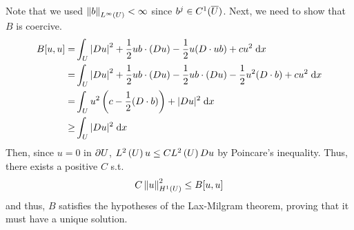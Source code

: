 Note that we used $\left\lVert b\right\rVert_{L^{\infty}(U)} < \infty$ since $b^j \in C^1({\overline {U}})$.
Next, we need to show that $B$ is coercive.
\begin{align*}
  B[u, u] = &\int_{U} \left\lvert D u \right\rvert^2
             + \frac{1}{2} u b \cdot (D u)
             - \frac{1}{2} u (D \cdot u b) + c u^2 \;\mathrm{d}x\\
          = &\int_{U} \left\lvert D u \right\rvert^2
             + \frac{1}{2} u b \cdot (D u)
             - \frac{1}{2} u b \cdot (D u)
             - \frac{1}{2} u^2 (D \cdot b) + c u^2 \;\mathrm{d}x\\
          = &\int_{U} u^2 \left(c - \frac{1}{2} (D \cdot b) \right)
                          + |D u|^2 \;\mathrm{d}x\\
       \geq &\int_{U} |D u|^2 \;\mathrm{d}x
\end{align*}
Then, since $u = 0$ in $\partial U$, $L^{2}\left(U \right){u} \leq C L^{2}\left(U \right){D u}$
by Poincare's inequality.
Thus, there exists a positive $C$ s.t.
\begin{align*}
  C \left\lVert u\right\rVert_{H^{1}(U)}^2 \leq B[u, u]
\end{align*}
and thus, $B$ satisfies the hypotheses of the Lax-Milgram theorem,
proving that it must have a unique solution.
